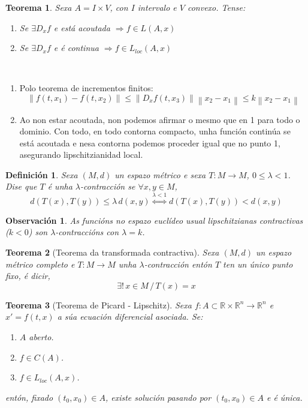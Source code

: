 \documentclass[11pt, a4paper,twoside]{article}
\makeatletter
\newcommand{\iindex}[1]{\emph{#1}\index{#1}}
\theoremstyle{theorem-style}  %
\newtheorem{theorem}{Teorema}[section]  %
\renewenvironment{proof}[1][\proofname]{\par
	\pushQED{\qed}%
	\normalfont \topsep6\p@\@plus6\p@\relax
	\list{}{%
		\settowidth{\leftmargin}{\quad:\hskip\labelsep}%
		\setlength{\labelwidth}{0pt}%
		\setlength{\itemindent}{-\leftmargin}%
	}%
	\item[\hskip\labelsep\itshape#1\@addpunct{:}]\ignorespaces
}{%
	\popQED\endlist\@endpefalse
}
\theoremstyle{definition-style}
\newtheorem{definition}{Definición}[section]
\newtheorem*{observation}{Observación} %
\theoremstyle{example-style}
\providecommand{\norm}[1]{\left\lVert#1\right\rVert} %
\makeatother
\begin{document}
\begin{theorem}\label{lloc_suf}
	Sexa $A = I \times V$, con $I$ intervalo e $V$ convexo. Tense:
	\begin{enumerate}
		\item Se $\exists D_x f$ e está acoutada $\Rightarrow f \in L(A, x)$
		\item Se $\exists D_x f$ e é continua $\Rightarrow f \in L_{loc}(A, x)$
	\end{enumerate}
\end{theorem}
\begin{proof}\ 
	\begin{enumerate}
		\item Polo teorema de incrementos finitos:
		\[\norm{f(t, x_1) - f(t, x_2)} \leq \norm{D_xf(t, x_3)} \norm{x_2 - x_1} \leq k\norm{x_2 - x_1}\]
		\item Ao non estar acoutada, non podemos afirmar o mesmo que en 1 para todo o dominio. Con todo, en todo contorna compacto, unha función continúa se está acoutada e nesa contorna podemos proceder igual que no punto 1, asegurando lipschitzianidad local.
	\end{enumerate}
\end{proof}
\begin{definition}
	Sexa $(M, d)$ un espazo métrico e sexa $T: M \longrightarrow M$, $0 \leq \lambda < 1$. Dise que $T$ é unha \iindex{$\lambda$-contracción} se $\forall x, y \in M$, 
	\[d(T(x), T(y)) \leq \lambda \, d(x, y) \stackrel{\lambda < 1}{\Leftrightarrow} d(T(x), T(y)) < d(x, y)\]
\end{definition}
\begin{observation}
	As funcións no espazo euclídeo usual lipschitzianas contractivas ($ k<0 $) son $\lambda$-contraccións con $ \lambda=k $.
\end{observation}
\begin{theorem}[Teorema da transformada contractiva]\label{transformada}
	Sexa $(M, d)$ un espazo métrico completo e $T: M \longrightarrow M$ unha $\lambda$-contracción entón $T$ ten un único punto fixo, é dicir,
	\[\exists! \, x \in M \,/\, T(x) = x\]
\end{theorem}
\begin{theorem}[Teorema de Picard - Lipschitz] \label{picard}
	Sexa $f : A \subset \mathbb{R} \times \mathbb{R}^n \longrightarrow \mathbb{R}^n$ e $x' = f(t, x)$ a súa ecuación diferencial asociada. Se:
	\begin{enumerate}[\quad i)]
		\item $A$ aberto.
		\item $f \in C(A)$.
		\item $f \in L_{loc} (A, x)$.
	\end{enumerate}
	entón, fixado $(t_0, x_0) \in A$, existe solución pasando por $(t_0, x_0) \in A$ e é única.
\end{theorem}
\end{document}
